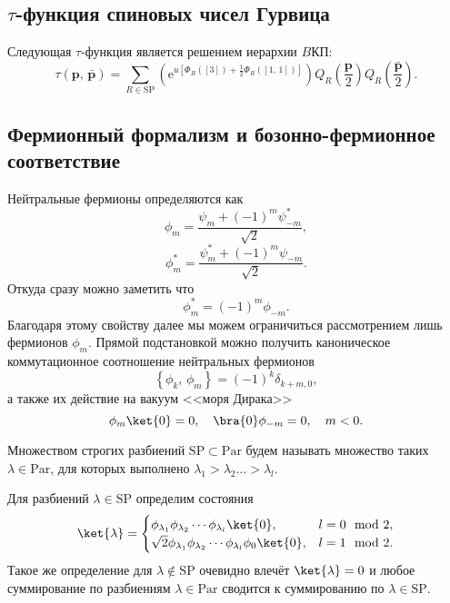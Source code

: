 \documentclass[a5paper,twoside]{article}
\numberwithin{equation}{section}
\begin{document}
\subsection{$\tau$-функция спиновых чисел Гурвица}
Следующая $\tau$-функция является решением иерархии $B$КП:
\begin{equation}
	\tau \left( \mathbf{p},\,\bar{\mathbf{p}} \right) =
	\sum_{R \in \mathrm{SP}}^{} \left( \mathrm{e} ^{u \left[ 
	\Phi_R\left( \left[ 3 \right]  \right) +\frac{1}{2}\Phi_R \left( \left[ 1,\,1 \right]  \right) \right] } \right) Q_R\left(\frac{\mathbf{p}}{2}\right)Q_R \left(\frac{\bar{\mathbf{p}}}{2}\right)
	\label{}
.\end{equation}

\subsection{Фермионный формализм и бозонно-фермионное соответствие}
Нейтральные фермионы определяются как
\begin{equation}
	\phi_m= \frac{\psi_m +\left( -1 \right) ^m \psi^*_{-m}}{\sqrt{2} }
,\end{equation} 
\begin{equation}
	\phi_m^*= \frac{\psi_m^* +\left( -1 \right) ^m \psi_{-m}}{\sqrt{2} }
.\end{equation}
Откуда сразу можно заметить что 
\begin{equation}
	\phi_m^*= (-1)^m \phi_{-m}
.\end{equation} 
Благодаря этому свойству далее мы можем ограничиться
рассмотрением лишь фермионов $ \phi_m  $.
Прямой подстановкой можно получить каноническое коммутационное соотношение нейтральных
фермионов
\begin{equation}
	\left\{ \phi_k,\,\phi_m \right\} =\left( -1 \right) ^k
	\delta_{k+m,0}
,\end{equation} 
а также их действие на вакуум <<моря Дирака>>
\begin{equation}
\phi_m \ket{0}=0,\quad
\bra{0}\phi_{-m} =0,\quad m<0.\end{equation} 

Множеством строгих разбиений $\mathrm{SP}\subset \mathrm{Par}$ будем называть множество таких $\lambda \in \mathrm{Par}$, для которых выполнено $\lambda_1>\lambda_2\ldots>\lambda_{l}$.


Для разбиений $\lambda \in \mathrm{SP}$ определим
состояния
\begin{equation}
\ket{\lambda}= \begin{cases}
\phi_{\lambda_1} \phi_{\lambda_2} \cdots \phi_{\lambda_{l}}
\ket{0},& l=0 \mod 2,\\
\sqrt{2} \phi_{\lambda_1}\phi_{\lambda_2}\cdots 
\phi_{\lambda_l} \phi_0 \ket{0},& l=1 \mod 2.
\end{cases}
\end{equation} 
Такое же определение для $\lambda \notin \mathrm{SP}$ очевидно влечёт $\ket{\lambda}=0$ и любое суммирование по разбиениям $\lambda \in \mathrm{Par}$ сводится к суммированию по $\lambda \in \mathrm{SP}$.
\end{document}
